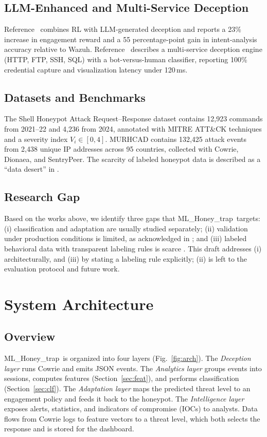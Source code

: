 \documentclass[conference]{IEEEtran}
\newcommand{\sys}{ML\_Honey\_trap}
\begin{document}
\subsection{LLM-Enhanced and Multi-Service Deception}
Reference~\cite{ref9} combines RL with LLM-generated deception and reports a 23\% increase in engagement reward and a 55 percentage-point gain in intent-analysis accuracy relative to Wazuh. Reference~\cite{ref6} describes a multi-service deception engine (HTTP, FTP, SSH, SQL) with a bot-versus-human classifier, reporting 100\% credential capture and visualization latency under 120\,ms.

\subsection{Datasets and Benchmarks}
The Shell Honeypot Attack Request--Response dataset \cite{ref10} contains 12,923 commands from 2021--22 and 4,236 from 2024, annotated with MITRE ATT\&CK \cite{ref15} techniques and a severity index $V_i\in[0,4]$. MURHCAD \cite{ref11} contains 132,425 attack events from 2,438 unique IP addresses across 95 countries, collected with Cowrie, Dionaea, and SentryPeer. The scarcity of labeled honeypot data is described as a ``data desert'' in \cite{ref12}.

\subsection{Research Gap}
Based on the works above, we identify three gaps that \sys\ targets: (i) classification and adaptation are usually studied separately; (ii) validation under production conditions is limited, as acknowledged in \cite{ref1}; and (iii) labeled behavioral data with transparent labeling rules is scarce \cite{ref12}. This draft addresses (i) architecturally, and (iii) by stating a labeling rule explicitly; (ii) is left to the evaluation protocol and future work.

\section{System Architecture}\label{sec:arch}
\subsection{Overview}
\sys\ is organized into four layers (Fig.~\ref{fig:arch}). The \emph{Deception layer} runs Cowrie and emits JSON events. The \emph{Analytics layer} groups events into sessions, computes features (Section~\ref{sec:feat}), and performs classification (Section~\ref{sec:clf}). The \emph{Adaptation layer} maps the predicted threat level to an engagement policy and feeds it back to the honeypot. The \emph{Intelligence layer} exposes alerts, statistics, and indicators of compromise (IOCs) to analysts. Data flows from Cowrie logs to feature vectors to a threat level, which both selects the response and is stored for the dashboard.
\end{document}
